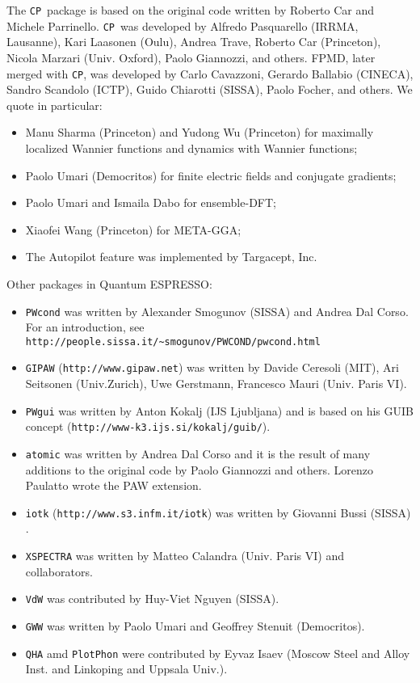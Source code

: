 \documentclass[12pt,a4paper]{article}
\def\qe{{\sc Quantum ESPRESSO}}
\def\CP{\texttt{CP}}
\begin{document}
The \CP\ package is based on the original code written by
 Roberto Car
and Michele Parrinello. \CP\ was developed by Alfredo Pasquarello
(IRRMA, Lausanne), Kari Laasonen (Oulu), Andrea Trave, Roberto
Car (Princeton), Nicola Marzari (Univ. Oxford), Paolo Giannozzi, and others.
FPMD, later merged with \CP, was developed by Carlo
Cavazzoni, 
Gerardo Ballabio (CINECA), Sandro Scandolo (ICTP), 
Guido Chiarotti (SISSA), Paolo Focher, and others.
We quote in particular:
\begin{itemize}
  \item Manu Sharma (Princeton) and Yudong Wu (Princeton) for
   maximally localized Wannier functions and dynamics with 
   Wannier functions;
  \item Paolo Umari (Democritos) for finite electric fields and conjugate
   gradients;
  \item Paolo Umari and Ismaila Dabo for ensemble-DFT;
  \item Xiaofei Wang (Princeton) for META-GGA;
  \item The Autopilot feature was implemented by Targacept, Inc.
\end{itemize}
Other packages in \qe:
\begin{itemize}
\item
\texttt{PWcond} was written by Alexander Smogunov (SISSA) and Andrea 
Dal Corso. For an introduction, see 
\texttt{http://people.sissa.it/\~{}smogunov/PWCOND/pwcond.html}
\item
\texttt{GIPAW} (\texttt{http://www.gipaw.net})
was written by Davide Ceresoli (MIT), Ari Seitsonen (Univ.Zurich),
Uwe Gerstmann,  Francesco Mauri (Univ. Paris VI).
\item
\texttt{PWgui} was written by Anton Kokalj (IJS Ljubljana) and is 
based on his GUIB concept (\texttt{http://www-k3.ijs.si/kokalj/guib/}).
\item
\texttt{atomic} was written by Andrea Dal Corso and it is the result 
of many additions to the original code by Paolo Giannozzi 
and others. Lorenzo Paulatto wrote the PAW extension.
\item
\texttt{iotk} (\texttt{http://www.s3.infm.it/iotk}) was written by Giovanni Bussi  (SISSA)  .
\item
\texttt{XSPECTRA} was written by Matteo Calandra (Univ. Paris VI)
and collaborators.
\item \texttt{VdW} was contributed by Huy-Viet Nguyen (SISSA).
\item \texttt{GWW} was written by Paolo Umari and Geoffrey Stenuit (Democritos).
\item
\texttt{QHA} amd \texttt{PlotPhon} were contributed by Eyvaz Isaev
 (Moscow Steel and Alloy Inst. and Linkoping and Uppsala Univ.).
\end{itemize}
\end{document}
